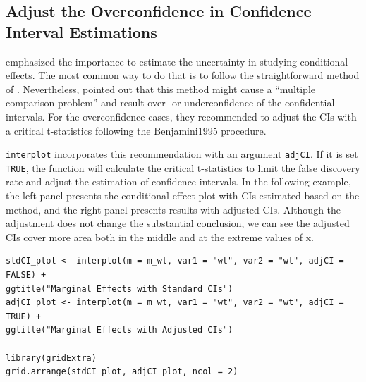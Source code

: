 \documentclass[
  article]{jss}
\begin{document}
\hypertarget{adjust-the-overconfidence-in-confidence-interval-estimations}{%
\subsection{Adjust the Overconfidence in Confidence Interval
Estimations}\label{adjust-the-overconfidence-in-confidence-interval-estimations}}

\citep{BerryDeMerittEsarey2016} emphasized the importance to estimate
the uncertainty in studying conditional effects. The most common way to
do that is to follow the straightforward method of
\citep{BramborClarkGolder2006}. Nevertheless, \citep{EsareySumner2018}
pointed out that this method might cause a ``multiple comparison
problem'' and result over- or underconfidence of the confidential
intervals. For the overconfidence cases, they recommended to adjust the
CIs with a critical t-statistics following the Benjamini1995 procedure.

\texttt{interplot} incorporates this recommendation with an argument
\texttt{adjCI}. If it is set \texttt{TRUE}, the function will calculate
the critical t-statistics to limit the false discovery rate and adjust
the estimation of confidence intervals. In the following example, the
left panel presents the conditional effect plot with CIs estimated based
on the \citep{BramborClarkGolder2006} method, and the right panel
presents results with adjusted CIs. Although the adjustment does not
change the substantial conclusion, we can see the adjusted CIs cover
more area both in the middle and at the extreme values of x.

\begin{verbatim}
stdCI_plot <- interplot(m = m_wt, var1 = "wt", var2 = "wt", adjCI = FALSE) +
ggtitle("Marginal Effects with Standard CIs")
adjCI_plot <- interplot(m = m_wt, var1 = "wt", var2 = "wt", adjCI = TRUE) +
ggtitle("Marginal Effects with Adjusted CIs")

library(gridExtra)
grid.arrange(stdCI_plot, adjCI_plot, ncol = 2)
\end{verbatim}
\end{document}
